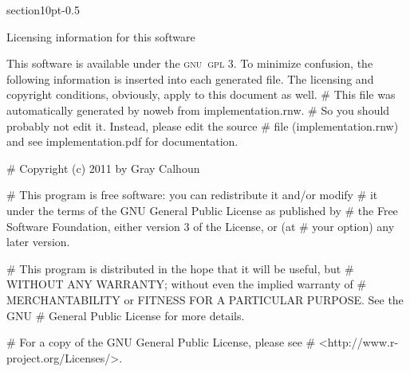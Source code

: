 \documentclass[10pt]{article}%
\makeatletter
\newcommand{\gnu}{\textsc{gnu}}
\renewcommand\section{\@startsection%
{section}{1}{0pt}{-\baselineskip}{0.5\baselineskip}%
{\normalfont\normalsize\bfseries\large\raggedright}}
\makeatother
\begin{document}
\section{Licensing information for this software}

This software is available under the \gnu\ \textsc{gpl} 3.  To
minimize confusion, the following information is inserted into each
generated file.  The licensing and copyright conditions, obviously,
apply to this document as well.
\nwenddocs{}\endmoddef\nwstartdeflinemarkup{}\nwenddeflinemarkup
 # This file was automatically generated by noweb from implementation.rnw.
 # So you should probably not edit it.  Instead, please edit the source
 # file (implementation.rnw) and see implementation.pdf for documentation.
  
 # Copyright (c) 2011 by Gray Calhoun
 
 # This program is free software: you can redistribute it and/or modify
 # it under the terms of the GNU General Public License as published by
 # the Free Software Foundation, either version 3 of the License, or (at
 # your option) any later version.

 # This program is distributed in the hope that it will be useful, but
 # WITHOUT ANY WARRANTY; without even the implied warranty of
 # MERCHANTABILITY or FITNESS FOR A PARTICULAR PURPOSE. See the GNU
 # General Public License for more details.

 # For a copy of the GNU General Public License, please see
 # <http://www.r-project.org/Licenses/>.
\nwendcode{}
\end{document}
